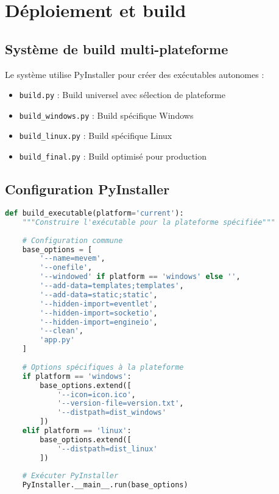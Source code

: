 \documentclass[12pt,a4paper]{article}
\begin{document}
\section{Déploiement et build}

\subsection{Système de build multi-plateforme}

Le système utilise PyInstaller pour créer des exécutables autonomes :

\begin{codebox}
\begin{itemize}
    \item \texttt{build.py} : Build universel avec sélection de plateforme
    \item \texttt{build\_windows.py} : Build spécifique Windows
    \item \texttt{build\_linux.py} : Build spécifique Linux
    \item \texttt{build\_final.py} : Build optimisé pour production
\end{itemize}
\end{codebox}

\subsection{Configuration PyInstaller}

\begin{lstlisting}[language=python, caption=Configuration PyInstaller type]
def build_executable(platform='current'):
    """Construire l'exécutable pour la plateforme spécifiée"""
    
    # Configuration commune
    base_options = [
        '--name=mevem',
        '--onefile',
        '--windowed' if platform == 'windows' else '',
        '--add-data=templates;templates',
        '--add-data=static;static',
        '--hidden-import=eventlet',
        '--hidden-import=socketio',
        '--hidden-import=engineio',
        '--clean',
        'app.py'
    ]
    
    # Options spécifiques à la plateforme
    if platform == 'windows':
        base_options.extend([
            '--icon=icon.ico',
            '--version-file=version.txt',
            '--distpath=dist_windows'
        ])
    elif platform == 'linux':
        base_options.extend([
            '--distpath=dist_linux'
        ])
    
    # Exécuter PyInstaller
    PyInstaller.__main__.run(base_options)
\end{lstlisting}
\end{document}
